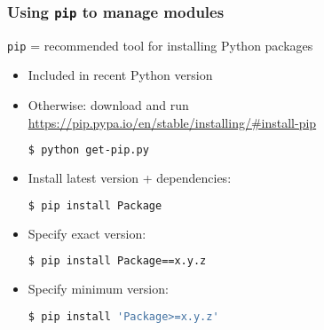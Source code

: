 \begin{frame}[fragile]
\frametitle{Using \texttt{pip} to manage modules}

\texttt{pip} = recommended tool for installing Python packages

\begin{description}
\item<2->[Installation:]
\begin{itemize}
\item Included in recent Python version
\item Otherwise: download and run \\
\url{https://pip.pypa.io/en/stable/installing/\#install-pip}
\begin{lstlisting}[language=bash]
$ python get-pip.py
\end{lstlisting}
\end{itemize}

\item<3->[Usage:]
\begin{itemize}
\item Install latest version + dependencies:
\begin{lstlisting}[language=bash]
$ pip install Package
\end{lstlisting}

\item Specify exact version:
\begin{lstlisting}[language=bash]
$ pip install Package==x.y.z
\end{lstlisting}
\item Specify minimum version:
\begin{lstlisting}[language=bash]
$ pip install 'Package>=x.y.z'
\end{lstlisting}
\end{itemize}

\end{description}

\end{frame}

